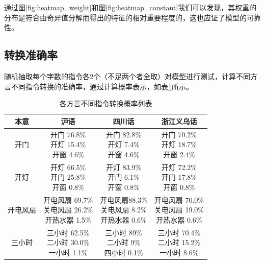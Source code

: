 \documentclass[lang=cn,cite=super]{elegantpaper}
\begin{document}
通过图\ref{fig:heatmap_weight}和图\ref{fig:heatmap_constant}我们可以发现，其权重的分布是符合由奇异值分解而得出的特征的相对重要程度的，这也应证了模型的可靠性。
\subsection{转换准确率}
随机抽取每个字数的指令各2个（不足两个者全取）对模型进行测试，计算不同方言不同指令转换的准确率，通过计算概率表示，如表\ref{tab:3}所示。
\begin{table}[h]
    \caption{\label{tab:3} 各方言不同指令转换概率列表}
    \begin{center}
        \begin{tabular}{cccc}
            \toprule
            本意 & 沪语 & 四川话 & 浙江义乌话\\
            \midrule
            开门 & \makecell{开门 76.8\%\\开灯 15.4\%\\开窗 4.6\%} & \makecell{开门 82.8\%\\ 开灯 7.4\%\\ 开窗 4.6\%} & \makecell{开门 70.2\%\\ 开灯 18.7\%\\ 开窗 2.4\%}\\
            开灯 & \makecell{开灯 66.5\% \\ 开门 25.8\% \\ 开窗 0.8\%} & \makecell{开灯 83.9\% \\ 开门 6.1\% \\ 开窗 0.8\%} &\makecell{开灯 72.2\% \\ 开门 17.8\% \\ 开窗 0.8\%}\\
            开电风扇 & \makecell{开电风扇 69.7\% \\ 关电风扇 26.2\% \\ 开热水器 1.5\%} & \makecell{开电风扇88.3\% \\ 关电风扇 8.2\% \\ 开热水器 0.6\%} & \makecell{开电风扇 70.0\% \\ 关电风扇 19.0\% \\ 开热水器 0.6\%}\\
            三小时 & \makecell{三小时 62.5\% \\ 二小时 30.0\% \\ 一小时 1.1\%} & \makecell{三小时 89\% \\ 二小时 9\% \\ 四小时 0.1\%} & \makecell{三小时 70.4\% \\ 二小时 15.2\% \\ 一小时 8.6\%}\\

\end{tabular}
\end{center}
\end{table}
\end{document}
